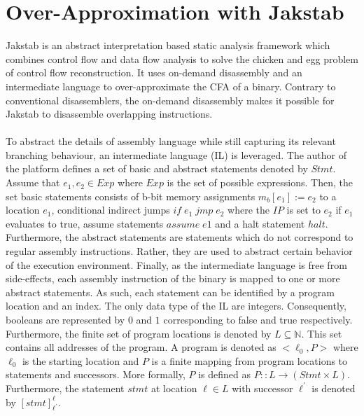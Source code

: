 \documentclass{kththesis}
\newcommand{\fbcomment}[1]{{#1}}
\renewcommand{\fbcomment}[1]{}
\begin{document}
\section{Over-Approximation with Jakstab}
\fbcomment{\color{red}Goal: give the reader an overview of Jakstab and enough understanding of the notation in the PhD thesis of Jakstab (So that this can be used in later sections such for example as the section about CPA modifications). Also, introduce concepts such as tops and bottoms in the context of the Jakstab tool}
Jakstab\cite{Jakstab} is an abstract interpretation based static analysis framework which combines control flow and data flow analysis to solve the chicken and egg problem of control flow reconstruction. It uses on-demand disassembly and an intermediate language to over-approximate the CFA of a binary. Contrary to conventional disassemblers, the on-demand disassembly makes it possible for Jakstab to disassemble overlapping instructions. 
\\ \\
To abstract the details of assembly language while still capturing its relevant branching behaviour, an intermediate language (IL) is leveraged. The author of the platform defines a set of basic and abstract statements denoted by $Stmt$. Assume that $e_1,e_2 \in Exp$ where $Exp$ is the set of possible expressions. Then, the set basic statements consists of b-bit memory assignments $m_b[e_1] := e_2$ to a location $e_1$, conditional indirect jumps $if\;e_1\;jmp\;e_2$ where the $IP$ is set to $e_2$ if $e_1$ evaluates to true, assume statements $assume\;e1$ and a halt statement $halt$. Furthermore, the abstract statements are statements which do not correspond to regular assembly instructions. Rather, they are used to abstract certain behavior of the execution environment\cite{Jakstab}. Finally, as the intermediate language is free from side-effects, each assembly instruction of the binary is mapped to one or more abstract statements. As such, each statement can be identified by a program location and an index. 
\clearpage
\noindent
The only data type of the IL are integers. Consequently, booleans are represented by $0$ and $1$ corresponding to false and true respectively. Furthermore, the finite set of program locations is denoted by $L \subseteq \mathbb{N}$. This set contains all addresses of the program. A program is denoted as $<\ell_0,P>$ where $\ell_0$ is the starting location and $P$ is a finite mapping from program locations to statements and successors. More formally, $P$ is defined as $P:: L \rightarrow (Stmt \times L)$. Furthermore, the statement $stmt$ at location $\ell \in L$ with successor $\ell^{'}$ is denoted by $[stmt]^{\ell}_{\ell^{'}}$. 
\end{document}
